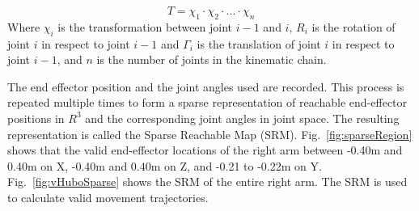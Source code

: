 \begin{equation}\label{eq:fk2}
T = \chi_1 \cdot \chi_2 \cdot ... \cdot \chi_n
\end{equation}
Where $\chi_i$ is the transformation between joint $i-1$ and $i$, $R_i$ is the rotation of joint $i$ in respect to joint $i-1$ and $\Gamma_i$ is the translation of joint $i$ in respect to joint $i-1$, and $n$ is the number of joints in the kinematic chain.

The end effector position and the joint angles used are recorded.  This process is repeated multiple times to form a sparse representation of reachable end-effector positions in $R^3$ and the corresponding joint angles in joint space.  The resulting representation is called the Sparse Reachable Map (SRM).  Fig.~\ref{fig:sparseRegion} shows that the valid end-effector locations of the right arm between -0.40m and 0.40m on X, -0.40m and 0.40m on Z, and -0.21 to -0.22m on Y.  Fig.~\ref{fig:vHuboSparse} shows the SRM of the entire right arm.  The SRM is used to calculate valid movement trajectories.


